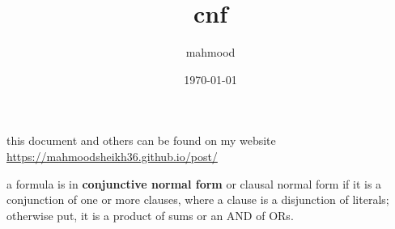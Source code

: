 \documentclass[a4paper,12pt]{article}
\author{mahmood}
\date{\today}
\title{cnf}
\begin{document}
\maketitle
\begin{note}
this document and others can be found on my website\\
\url{https://mahmoodsheikh36.github.io/post/}
\end{note}
\begin{definition}
a formula is in \textbf{conjunctive normal form} or clausal normal form if it is a conjunction of one or more clauses, where a clause is a disjunction of literals; otherwise put, it is a product of sums or an AND of ORs.\\
\end{definition}
\end{document}

